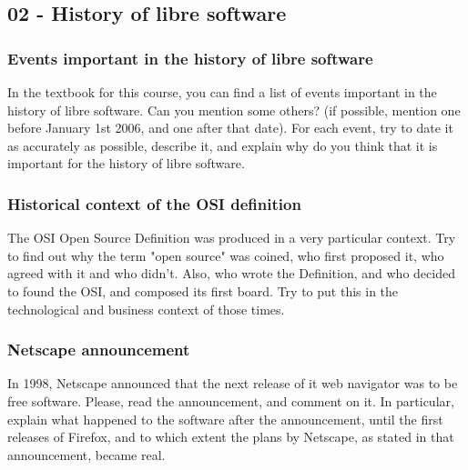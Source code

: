 \documentclass[a4paper]{article}
\begin{document}
\subsection{02 - History of libre software}


\subsubsection{Events important in the history of libre software}
\label{exe:events-history}

In the textbook for this course, you can find a list of events important in the history of libre software. Can you mention some others? (if possible, mention one before January 1st 2006, and one after that date). For each event, try to date it as accurately as possible, describe it, and explain why do you think that it is important for the history of libre software.

\subsubsection{Historical context of the OSI definition}
\label{exe:context-osi-definition}

The OSI Open Source Definition was produced in a very particular context. Try to find out why the term "open source" was coined, who first proposed it, who agreed with it and who didn't. Also, who wrote the Definition, and who decided to found the OSI, and composed its first board. Try to put this in the technological and business context of those times. 

\subsubsection{Netscape announcement}
\label{exe:netscape-announcement}

In 1998, Netscape announced that the next release of it web navigator was to be free software. Please, read the announcement, and comment on it. In particular, explain what happened to the software after the announcement, until the first releases of Firefox, and to which extent the plans by Netscape, as stated in that announcement, became real.
\end{document}
